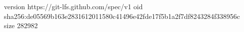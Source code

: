 version https://git-lfs.github.com/spec/v1
oid sha256:de05569b163e2831612011580c41496e42fde17f5b1a2f7df8243284f338956c
size 282982
